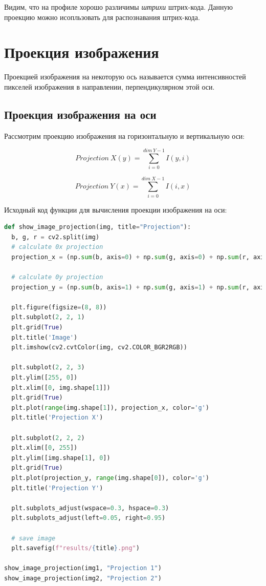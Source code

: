 Видим, что на профиле хорошо различимы  \textit{штрихи} штрих-кода. Данную проекцию можно исопльзовать для распознавания штрих-кода. 

\section{Проекция изображения}

Проекцией изображения на некоторую ось называется сумма интенсивностей пикселей изображения в направлении, перпендикулярном этой оси.

\subsection{Проекция изображения на оси}

Рассмотрим проекцию изображения на горизонтальную и вертикальную оси:

\begin{equation}
  Projection~X(y) = \sum\limits_{i=0}^{dim~Y - 1} I(y, i)
\end{equation}

\begin{equation}
  Projection~Y(x) = \sum\limits_{i=0}^{dim~X - 1} I(i, x)
\end{equation}

Исходный код функции для вычисления проекции изображения на оси:

\begin{lstlisting}[language=Python]
def show_image_projection(img, title="Projection"):
  b, g, r = cv2.split(img)
  # calculate 0x projection
  projection_x = (np.sum(b, axis=0) + np.sum(g, axis=0) + np.sum(r, axis=0)) / img.shape[0] / 3

  # calculate 0y projection
  projection_y = (np.sum(b, axis=1) + np.sum(g, axis=1) + np.sum(r, axis=1)) / img.shape[1] / 3

  plt.figure(figsize=(8, 8))
  plt.subplot(2, 2, 1)
  plt.grid(True)
  plt.title('Image')
  plt.imshow(cv2.cvtColor(img, cv2.COLOR_BGR2RGB))

  plt.subplot(2, 2, 3)
  plt.ylim([255, 0])
  plt.xlim([0, img.shape[1]])
  plt.grid(True)
  plt.plot(range(img.shape[1]), projection_x, color='g')
  plt.title('Projection X')

  plt.subplot(2, 2, 2)
  plt.xlim([0, 255])
  plt.ylim([img.shape[1], 0])
  plt.grid(True)
  plt.plot(projection_y, range(img.shape[0]), color='g')
  plt.title('Projection Y')

  plt.subplots_adjust(wspace=0.3, hspace=0.3)
  plt.subplots_adjust(left=0.05, right=0.95)

  # save image
  plt.savefig(f"results/{title}.png")

show_image_projection(img1, "Projection 1")
show_image_projection(img2, "Projection 2")
\end{lstlisting}

